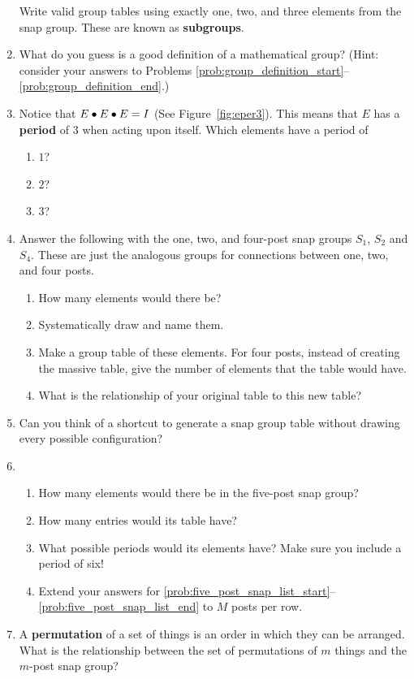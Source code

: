 \documentclass[../gatm.tex]{subfiles}
\begin{document}
\begin{enumerate}
	      Write valid group tables using exactly one, two, and three elements from the snap group. These are known as \textbf{subgroups}.\label{prob:group_definition_end}
	\item What do you guess is a good definition of a mathematical group?
	      (Hint: consider your answers to Problems \ref{prob:group_definition_start}--\ref{prob:group_definition_end}.)
	\item Notice that $E\bullet E\bullet E=I$ (See Figure~\ref{fig:eper3}).
	      This means that $E$ has a \textbf{period} of $3$ when acting upon itself.
	      Which elements have a period of
	      \begin{multicols}{3}
		      \begin{enumerate}
			      \item $1$?
			      \item $2$?
			      \item $3$?
		      \end{enumerate}
	      \end{multicols}
	\item Answer the following with the one, two, and four-post snap groups $S_1$, $S_2$ and $S_4$. These are just the analogous groups for connections between one, two, and four posts. \begin{enumerate}
		      \item How many elements would there be?
		      \item Systematically draw and name them.
		      \item Make a group table of these elements.
		            For four posts, instead of creating the massive table, give the number of elements that the table would have.
		      \item What is the relationship of your original table to this new table?
	      \end{enumerate}
	\item Can you think of a shortcut to generate a snap group table without drawing every possible configuration?
	\item \begin{enumerate}
		      \item How many elements would there be in the five-post snap group? \label{prob:five_post_snap_list_start}
		      \item How many entries would its table have?
		      \item What possible periods would its elements have? Make sure you include a period of six! \label{prob:five_post_snap_list_end}
		      \item Extend your answers for \ref{prob:five_post_snap_list_start}--\ref{prob:five_post_snap_list_end} to $M$ posts per row.
	      \end{enumerate}
	\item A \textbf{permutation} of a set of things is an order in which they can be arranged.
	      What is the relationship between the set of permutations of $m$ things and the $m$-post snap group?
\end{enumerate}
\end{document}
